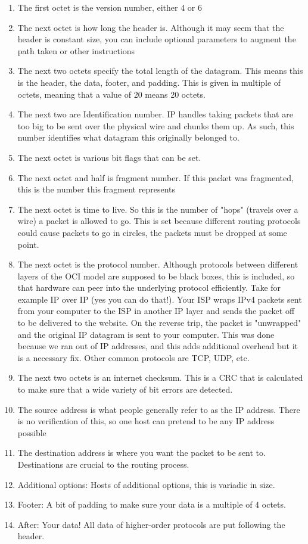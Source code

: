 \begin{enumerate}
  \item The first octet is the version number, either 4 or 6
  \item The next octet is how long the header is.
    Although it may seem that the header is constant size, you can include optional parameters to augment the path taken or other instructions
  \item The next two octets specify the total length of the datagram.
    This means this is the header, the data, footer, and padding.
    This is given in multiple of octets, meaning that a value of 20 means 20 octets.
  \item The next two are Identification number.
    IP handles taking packets that are too big to be sent over the physical wire and chunks them up.
    As such, this number identifies what datagram this originally belonged to.
  \item The next octet is various bit flags that can be set.
  \item The next octet and half is fragment number.
    If this packet was fragmented, this is the number this fragment represents
  \item The next octet is time to live.
    So this is the number of "hops" (travels over a wire) a packet is allowed to go.
    This is set because different routing protocols could cause packets to go in circles, the packets must be dropped at some point.
  \item The next octet is the protocol number.
    Although protocols between different layers of the OCI model are supposed to be black boxes, this is included, so that hardware can peer into the underlying protocol efficiently.
    Take for example IP over IP (yes you can do that!).
    Your ISP wraps IPv4 packets sent from your computer to the ISP in another IP layer and sends the packet off to be delivered to the website.
    On the reverse trip, the packet is "unwrapped" and the original IP datagram is sent to your computer.
    This was done because we ran out of IP addresses, and this adds additional overhead but it is a necessary fix.
    Other common protocols are TCP, UDP, etc.
  \item The next two octets is an internet checksum.
    This is a CRC that is calculated to make sure that a wide variety of bit errors are detected.
  \item The source address is what people generally refer to as the IP address.
    There is no verification of this, so one host can pretend to be any IP address possible
  \item The destination address is where you want the packet to be sent to.
    Destinations are crucial to the routing process.
  \item Additional options: Hosts of additional options, this is variadic in size.
  \item Footer: A bit of padding to make sure your data is a multiple of 4 octets.
  \item After: Your data! All data of higher-order protocols are put following the header.
\end{enumerate}

